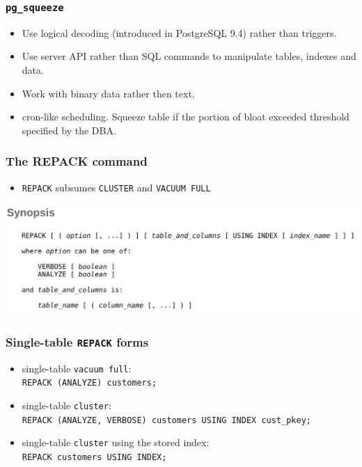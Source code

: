 \begin{frame}
  \frametitle{\texttt{pg\_squeeze}}
  \begin{itemize}
    \item Use logical decoding (introduced in PostgreSQL 9.4) rather than
      triggers.
    \item Use server API rather than SQL commands to manipulate tables,
      indexes and data.
    \item Work with binary data rather then text.
    \item cron-like scheduling. Squeeze table if the portion of bloat exceeded
      threshold specified by the DBA.
  \end{itemize}
\end{frame}



\begin{frame}
  \frametitle{The REPACK command}
  \begin{itemize}
    \item \texttt{REPACK} subsumes \texttt{CLUSTER} and \texttt{VACUUM FULL}
  \end{itemize}
  \includegraphics[width=\textwidth]{repack.png}
\end{frame}

\begin{frame}
  \frametitle{Single-table \texttt{REPACK} forms}
  \begin{itemize}
    \item single-table \texttt{vacuum full}: \\
      \texttt{REPACK (ANALYZE) customers;}
    \item single-table \texttt{cluster}: \\
      \texttt{REPACK (ANALYZE, VERBOSE) customers USING INDEX cust\_pkey;}
    \item single-table \texttt{cluster} using the stored index: \\
      \texttt{REPACK customers USING INDEX;}
  \end{itemize}
\end{frame}


